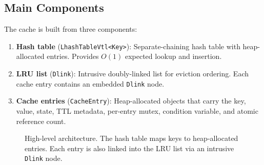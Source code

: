\documentclass[11pt,a4paper]{article}
\begin{document}
\subsection{Main Components}

The cache is built from three components:

\begin{enumerate}
\item \textbf{Hash table} (\texttt{LhashTableVtl<Key>}): Separate-chaining
      hash table with heap-allocated entries.  Provides $O(1)$ expected
      lookup and insertion.
\item \textbf{LRU list} (\texttt{Dlink}): Intrusive doubly-linked list
      for eviction ordering.  Each cache entry contains an embedded
      \texttt{Dlink} node.
\item \textbf{Cache entries} (\texttt{CacheEntry}): Heap-allocated
      objects that carry the key, value, state, TTL metadata, per-entry
      mutex, condition variable, and atomic reference count.
\end{enumerate}

\begin{figure}[htbp]
\centering
{}
\caption{High-level architecture.  The hash table maps keys to
         heap-allocated entries.  Each entry is also linked into the
         LRU list via an intrusive \texttt{Dlink} node.}
\end{figure}
\end{document}
